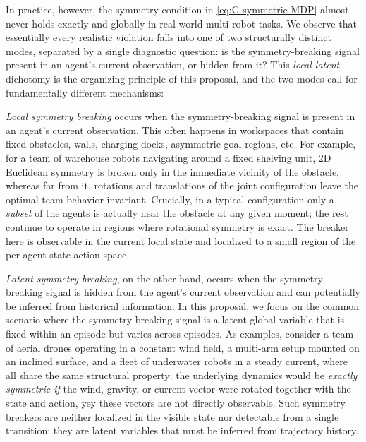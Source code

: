 \documentclass[11pt]{article}
\begin{document}
In practice, however, the symmetry condition in \eqref{eq:G-symmetric MDP} almost never holds exactly and globally in real-world multi-robot tasks.
We observe that essentially every realistic violation falls into one of two structurally distinct modes, separated by a single diagnostic question:
is the symmetry-breaking signal present in an agent's current observation, or hidden from it? 
This {\em local-latent} dichotomy is the organizing principle of this proposal, and the two modes call for fundamentally different mechanisms:

{\em Local symmetry breaking} occurs when the symmetry-breaking signal is present in an agent's current observation.
This often happens in workspaces that contain fixed obstacles, walls, charging docks, asymmetric goal regions, etc. 
For example, for a team of warehouse robots navigating around a fixed shelving unit, 2D Euclidean symmetry is broken only in the immediate vicinity of the obstacle, whereas far from it, rotations and translations of the joint configuration leave the optimal team behavior invariant.
Crucially, in a typical configuration only a {\em subset} of the agents is actually near the obstacle at any given moment; the rest continue to operate in regions where rotational symmetry is exact. The breaker here is observable in the current
local state and localized to a small region of the per-agent state-action space.

{\em Latent symmetry breaking}, on the other hand, occurs when the symmetry-breaking signal is hidden from the agent's current observation and can potentially be inferred from historical information.
In this proposal, we focus on the common scenario where the symmetry-breaking signal is a latent global variable that is fixed within an episode but varies across episodes.
As examples, consider a team of aerial drones operating in a constant wind field, a multi-arm setup mounted on an inclined surface, and a fleet of underwater robots in a steady current, where all share the same structural property: the underlying dynamics would be {\em exactly symmetric if} the wind, gravity, or current vector were rotated together with the state and action, yey these vectors are not directly observable.
Such symmetry breakers are neither localized in the visible
state nor detectable from a single transition; they are latent variables that must be inferred from trajectory history.
\end{document}
